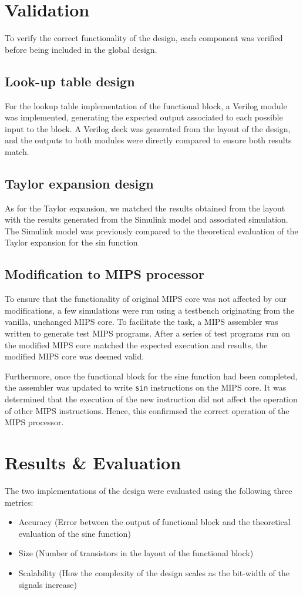 \documentclass[10pt,journal]{IEEEtran}
\begin{document}
\section{Validation}
	To verify the correct functionality of the design, each component was verified before being included in the global design.
	\subsection{Look-up table design}
	For the lookup table implementation of the functional block, a Verilog module was implemented, generating the expected output associated to each possible input to the block. A Verilog deck was generated from the layout of the design, and the outputs to both modules were directly compared to ensure both results match.

	\subsection{Taylor expansion design}
	As for the Taylor expansion, we matched the results obtained from the layout with the results generated from the Simulink model and associated simulation. The Simulink model was previously compared to the theoretical evaluation of the Taylor expansion for the sin function

	\subsection{Modification to MIPS processor}
To ensure that the functionality of original MIPS core was not affected by our modifications, a few simulations were run using a testbench originating from the vanilla, unchanged MIPS core. To facilitate the task, a MIPS assembler was written to generate test MIPS programs. After a series of test programs run on the modified MIPS core matched the expected execution and results, the modified MIPS core was deemed valid.

Furthermore, once the functional block for the sine function had been completed, the assembler was updated to write \texttt{sin} instructions on the MIPS core. It was determined that the execution of the new instruction did not affect the operation of other MIPS instructions. Hence, this confirmsed the correct operation of the MIPS processor.

\section{Results \& Evaluation}
The two implementations of the design were evaluated using the following three metrics:
\begin{itemize}
\item Accuracy (Error between the output of functional block and the theoretical evaluation of the sine function)
\item Size (Number of transistors in the layout of the functional block)
\item Scalability (How the complexity of the design scales as the bit-width of the signals increase)
\end{itemize}
\end{document}
